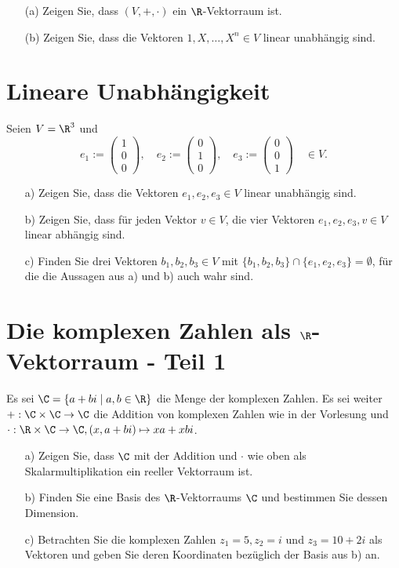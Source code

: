 \begin{itemize}
	\item[(a)] Zeigen Sie, dass $(V,+,\cdot)$  ein $\R$-Vektorraum ist.
	\item[(b)] Zeigen Sie, dass die Vektoren $1, X, \ldots, X^n \in V$ linear unabh\"angig sind.
\end{itemize}

\section{Lineare Unabh\"angigkeit}

Seien $V = \R^3$ und
$$
	e_1 :=
	\begin{pmatrix}
		1\\
		0\\
		0	
	\end{pmatrix},
	\quad
	e_2 :=
	\begin{pmatrix}
		0\\
		1\\
		0	
	\end{pmatrix},
	\quad
	e_3 :=
	\begin{pmatrix}
		0\\
		0\\
		1	
	\end{pmatrix}
	\quad
	\in V.
$$
\begin{itemize}
	\item[a)] Zeigen Sie, dass die Vektoren $e_1, e_2, e_3 \in V$ linear unabh\"angig sind.
	\item[b)] Zeigen Sie, dass f\"ur jeden Vektor $v\in V$, die vier Vektoren $e_1, e_2, e_3, v \in V$ linear abh\"angig sind.
	\item[c)] Finden Sie drei Vektoren $b_1,b_2,b_3 \in V$ mit $\{b_1,b_2,b_3\}\cap\{e_1,e_2,e_3\} = \emptyset$, für die die Aussagen aus a) und b) auch wahr sind.
\end{itemize}

%
\section{Die komplexen Zahlen als $\R$-Vektorraum - Teil 1}
Es sei $\C=\{a+bi \mid a,b \in \R\}$ die Menge der komplexen Zahlen. Es sei weiter \\ $+: \C \times \C \to \C$ die Addition von komplexen Zahlen wie in der Vorlesung und \\$\cdot: \R \times \C \to \C, (x,a+bi) \mapsto xa+xbi$.
\begin{itemize}
\item[a)] Zeigen Sie, dass $\C$ mit der Addition und $\cdot$ wie oben als Skalarmultiplikation ein reeller Vektorraum ist.
\item[b)] Finden Sie eine Basis des $\R$-Vektorraums $\C$ und bestimmen Sie dessen \\Dimension.
\item[c)] Betrachten Sie die komplexen Zahlen $z_1=5, z_2=i$ und $z_3=10+2i$ als Vektoren und geben Sie deren Koordinaten bezüglich der Basis aus b) an.

\end{itemize}

